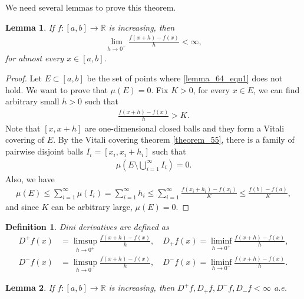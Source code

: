 \documentclass[11pt]{book}
\newtheorem{definition}{Definition}[chapter]
\newtheorem{lemma}{Lemma}[chapter]
\theoremstyle{definition}
\numberwithin{equation}{chapter}
\begin{document}
We need several lemmas to prove this theorem.

\medskip

\begin{lemma}
If $f: [a,b] \to \mathbb{R}$ is increasing, then 
\begin{align}\label{lemma_64_equ1}
    \lim_{h \to 0^+} \frac{f(x+h) - f(x)}{h} < \infty,
\end{align}
for almost every $x \in [a,b]$.
\end{lemma}
\begin{proof}
Let $E \subset [a,b]$ be the set of points where \eqref{lemma_64_equ1} does not hold. We want to prove that $\mu(E) = 0$. Fix $K > 0$, for every $x \in E$, we can find arbitrary small $h > 0$ such that 
\begin{align*}
    \frac{f(x+h) - f(x)}{h} > K.
\end{align*}
Note that $[x,x+h]$ are one-dimensional closed balls and they form a Vitali covering of $E$. By the Vitali covering theorem \ref{theorem_55}, there is a family of pairwise disjoint balls $I_i = [x_i,x_i+h_i]$ such that 
\begin{align*}
    \mu\left(E \setminus \bigcup^\infty_{i=1} I_i\right) = 0.
\end{align*}
Also, we have
\begin{align*}
    \mu(E) \leq \sum^\infty_{i=1} \mu(I_i) = \sum^\infty_{i=1} h_i \leq \sum^\infty_{i=1} \frac{f(x_i+h_i) - f(x_i)}{K} \leq \frac{f(b) - f(a)}{K},
\end{align*}
and since $K$ can be arbitrary large, $\mu(E) = 0$.
\end{proof}

\medskip

\begin{definition}
Dini derivatives are defined as
\begin{align*}
    D^+f(x) & = \limsup_{h \to 0^+} \frac{f(x+h) - f(x)}{h}, \quad D_+f(x) = \liminf_{h \to 0^+} \frac{f(x+h) - f(x)}{h}, \\
    D^-f(x) & = \limsup_{h \to 0^-} \frac{f(x+h) - f(x)}{h}, \quad D^-f(x) = \liminf_{h \to 0^-} \frac{f(x+h) - f(x)}{h}.
\end{align*}
\end{definition}

\medskip

\begin{lemma}
If $f: [a,b] \to \mathbb{R}$ is increasing, then $D^+f, D_+f, D^-f, D_-f < \infty$ a.e.
\end{lemma}
\end{document}
